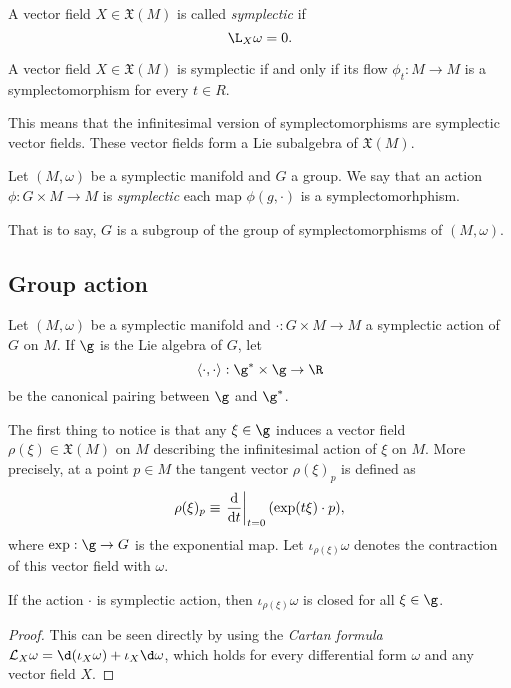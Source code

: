 \documentclass{worksheetclass}
\begin{document}
        \begin{defn}
            A vector field $X\in\mathfrak{X}(M)$ is called \emph{symplectic} if
            \begin{equation*}
                \L_X\omega = 0.
            \end{equation*}
        \end{defn}
        \begin{prop}
            A vector field $X\in\mathfrak{X}(M)$ is symplectic if and only if its flow $\phi_t:M\to M$ is a symplectomorphism for every $t\in R$.
        \end{prop}
        This means that the infinitesimal version of symplectomorphisms are symplectic vector fields. These vector fields form a Lie subalgebra of $\mathfrak{X}(M)$.

        \begin{defn}
            Let $(M,\omega)$ be a symplectic manifold and $G$ a group. We say that an action $\phi:G\times M\to M$ is \emph{symplectic} each map $\phi(g,\cdot)$ is a symplectomorhphism.
        \end{defn}
        That is to say, $G$ is a subgroup of the group of symplectomorphisms of $(M,\omega)$.

    \subsection{Group action}

        Let $(M,\omega)$ be a symplectic manifold and $\cdot:G\times M\to M$ a symplectic action of $G$ on $M$. If $\g$ is the Lie algebra of $G$, let
        \begin{equation}
            \langle\cdot,\cdot\rangle : \g^*\times\g\to\R
        \end{equation}
        be the canonical pairing between $\g$ and $\g^*$. 
        
        The first thing to notice is that any $\xi\in\g$ induces a vector field $\rho(\xi)\in\mathfrak{X}(M)$ on $M$ describing the infinitesimal action of $\xi$ on $M$. More precisely, at a point $p\in M$ the tangent vector $\rho(\xi)_p$ is defined as
        \begin{equation}
            \rho(\xi)_p\equiv\eval{\dv{}{t}}_{t=0}(\exp(t\xi)\cdot p),
        \end{equation}
        where $\exp:\g\to G$ is the exponential map. Let $\iota_{\rho(\xi)}\omega$ denotes the contraction of this vector field with $\omega$.
        \begin{prop}
            If the action $\cdot$ is symplectic action, then $\iota_{\rho(\xi)}\omega$ is closed for all $\xi\in\g$.
        \end{prop}
        \begin{proof}
            This can be seen directly by using the \emph{Cartan formula} $\mathcal{L}_X\omega=\d(\iota_X\omega)+\iota_X\d\omega$, which holds for every differential form $\omega$ and any vector field $X$.
        \end{proof}
\end{document}
